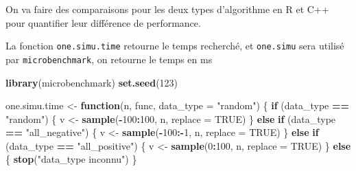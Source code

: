 \documentclass[
]{article}
\newenvironment{Shaded}{\begin{snugshade}}{\end{snugshade}}
\newcommand{\AttributeTok}[1]{\textcolor[rgb]{0.13,0.29,0.53}{#1}}
\newcommand{\ConstantTok}[1]{\textcolor[rgb]{0.56,0.35,0.01}{#1}}
\newcommand{\ControlFlowTok}[1]{\textcolor[rgb]{0.13,0.29,0.53}{\textbf{#1}}}
\newcommand{\DecValTok}[1]{\textcolor[rgb]{0.00,0.00,0.81}{#1}}
\newcommand{\FunctionTok}[1]{\textcolor[rgb]{0.13,0.29,0.53}{\textbf{#1}}}
\newcommand{\NormalTok}[1]{#1}
\newcommand{\OtherTok}[1]{\textcolor[rgb]{0.56,0.35,0.01}{#1}}
\newcommand{\SpecialCharTok}[1]{\textcolor[rgb]{0.81,0.36,0.00}{\textbf{#1}}}
\newcommand{\StringTok}[1]{\textcolor[rgb]{0.31,0.60,0.02}{#1}}
\begin{document}
On va faire des comparaisons pour les deux types d'algorithme en R et
C++ pour quantifier leur différence de performance.

La fonction \texttt{one.simu.time} retourne le temps recherché, et
\texttt{one.simu} sera utilisé par \texttt{microbenchmark}, on retourne
le temps en ms

\begin{Shaded}
\begin{Highlighting}[]
\FunctionTok{library}\NormalTok{(microbenchmark)}
\FunctionTok{set.seed}\NormalTok{(}\DecValTok{123}\NormalTok{)}

\NormalTok{one.simu.time }\OtherTok{\textless{}{-}} \ControlFlowTok{function}\NormalTok{(n, func, }\AttributeTok{data\_type =} \StringTok{"random"}\NormalTok{) \{}
  \ControlFlowTok{if}\NormalTok{ (data\_type }\SpecialCharTok{==} \StringTok{"random"}\NormalTok{) \{}
\NormalTok{    v }\OtherTok{\textless{}{-}} \FunctionTok{sample}\NormalTok{(}\SpecialCharTok{{-}}\DecValTok{100}\SpecialCharTok{:}\DecValTok{100}\NormalTok{, n, }\AttributeTok{replace =} \ConstantTok{TRUE}\NormalTok{)}
\NormalTok{  \} }\ControlFlowTok{else} \ControlFlowTok{if}\NormalTok{ (data\_type }\SpecialCharTok{==} \StringTok{"all\_negative"}\NormalTok{) \{}
\NormalTok{    v }\OtherTok{\textless{}{-}} \FunctionTok{sample}\NormalTok{(}\SpecialCharTok{{-}}\DecValTok{100}\SpecialCharTok{:{-}}\DecValTok{1}\NormalTok{, n, }\AttributeTok{replace =} \ConstantTok{TRUE}\NormalTok{)}
\NormalTok{  \} }\ControlFlowTok{else} \ControlFlowTok{if}\NormalTok{ (data\_type }\SpecialCharTok{==} \StringTok{"all\_positive"}\NormalTok{) \{}
\NormalTok{    v }\OtherTok{\textless{}{-}} \FunctionTok{sample}\NormalTok{(}\DecValTok{0}\SpecialCharTok{:}\DecValTok{100}\NormalTok{, n, }\AttributeTok{replace =} \ConstantTok{TRUE}\NormalTok{)}
\NormalTok{  \} }\ControlFlowTok{else}\NormalTok{ \{}
    \FunctionTok{stop}\NormalTok{(}\StringTok{"data\_type inconnu"}\NormalTok{)}
\NormalTok{  \}}


\end{Highlighting}
\end{Shaded}
\end{document}
